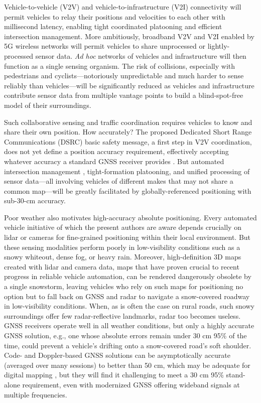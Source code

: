 \documentclass[10pt,journal,twocolumn]{IEEEtran} %
\begin{document}
 Vehicle-to-vehicle (V2V) and vehicle-to-infrastructure
(V2I) connectivity will permit vehicles to relay their positions and
velocities to each other with millisecond latency, enabling tight coordinated
platooning and efficient intersection management.  More ambitiously, broadband
V2V and V2I enabled by 5G wireless networks will permit vehicles to share
unprocessed or lightly-processed sensor data. \emph{Ad hoc} networks of
vehicles and infrastructure will then function as a single sensing organism.
The risk of collisions, especially with pedestrians and cyclists---notoriously
unpredictable and much harder to sense reliably than vehicles---will be
significantly reduced as vehicles and infrastructure contribute sensor data
from multiple vantage points to build a blind-spot-free model of their
surroundings.

Such collaborative sensing and traffic coordination requires vehicles to know
and share their own position.  How accurately?  The proposed Dedicated Short
Range Communications (DSRC) basic safety message, a first step in V2V
coordination, does not yet define a position accuracy requirement, effectively
accepting whatever accuracy a standard GNSS receiver provides
\cite{kenney2011dedicated}.  But automated intersection management
\cite{fajardo2011automated}, tight-formation platooning, and unified
processing of sensor data---all involving vehicles of different makes that may
not share a common map---will be greatly facilitated by globally-referenced
positioning with sub-30-cm accuracy.

Poor weather also motivates high-accuracy absolute positioning.  Every
automated vehicle initiative of which the present authors are aware depends
crucially on lidar or cameras for fine-grained positioning within their local
environment.  But these sensing modalities perform poorly in low-visibility
conditions such as a snowy whiteout, dense fog, or heavy rain.  Moreover,
high-definition 3D maps created with lidar and camera data, maps that have
proven crucial to recent progress in reliable vehicle automation, can be
rendered dangerously obsolete by a single snowstorm, leaving vehicles who rely
on such maps for positioning no option but to fall back on GNSS and radar to
navigate a snow-covered roadway in low-visibility conditions.  When, as is
often the case on rural roads, such snowy surroundings offer few
radar-reflective landmarks, radar too becomes useless.  GNSS receivers operate
well in all weather conditions, but only a highly accurate GNSS solution,
e.g., one whose absolute errors remain under 30 cm 95\% of the time, could
prevent a vehicle's drifting onto a snow-covered road's soft shoulder.  Code-
and Doppler-based GNSS solutions can be asymptotically accurate (averaged over
many sessions) to better than 50 cm, which may be adequate for digital mapping
\cite{narula2018accurate}, but they will find it challenging to meet a 30 cm
95\% stand-alone requirement, even with modernized GNSS offering wideband
signals at multiple frequencies.
\end{document}
